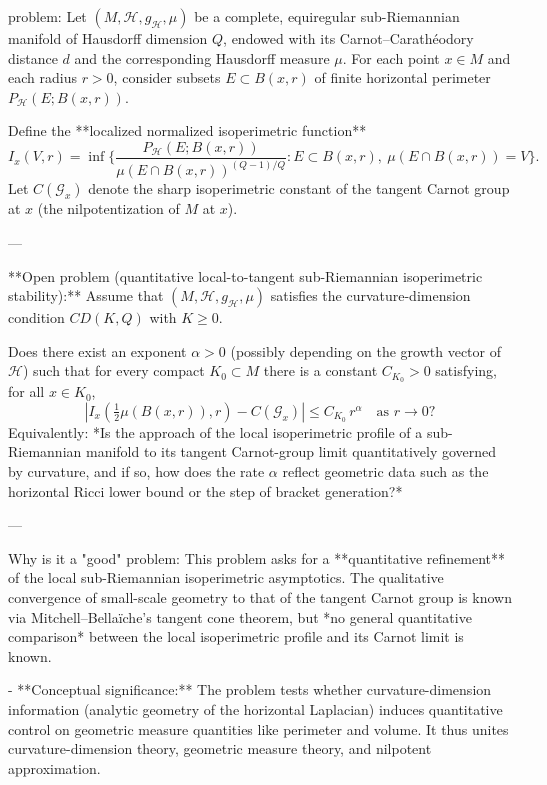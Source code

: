 problem:  
Let \((M, \mathcal{H}, g_{\mathcal{H}}, \mu)\) be a complete, equiregular sub-Riemannian manifold of Hausdorff dimension \(Q\), endowed with its Carnot–Carathéodory distance \(d\) and the corresponding Hausdorff measure \(\mu\). For each point \(x \in M\) and each radius \(r > 0\), consider subsets \(E \subset B(x,r)\) of finite horizontal perimeter \(P_{\mathcal{H}}(E; B(x,r))\).  

Define the **localized normalized isoperimetric function**  
\[
I_x(V, r) = \inf\Bigg\{ 
\frac{P_{\mathcal{H}}(E; B(x,r))}{\mu(E\cap B(x,r))^{(Q-1)/Q}} 
: E \subset B(x,r),\ \mu(E\cap B(x,r)) = V
\Bigg\}.
\]
Let \(C(\mathcal{G}_x)\) denote the sharp isoperimetric constant of the tangent Carnot group at \(x\) (the nilpotentization of \(M\) at \(x\)).  

---

**Open problem (quantitative local-to-tangent sub-Riemannian isoperimetric stability):**  
Assume that \((M, \mathcal{H}, g_{\mathcal{H}}, \mu)\) satisfies the curvature-dimension condition \(CD(K,Q)\) with \(K \ge 0\).  

Does there exist an exponent \(\alpha > 0\) (possibly depending on the growth vector of \(\mathcal{H}\)) such that for every compact \(K_0 \subset M\) there is a constant \(C_{K_0} > 0\) satisfying, for all \(x \in K_0\),
\[
\left| I_x\!\left(\tfrac{1}{2}\mu(B(x,r)), r\right) - C(\mathcal{G}_x) \right|
\le C_{K_0}\, r^{\alpha} \quad \text{as } r \to 0?
\]
Equivalently: *Is the approach of the local isoperimetric profile of a sub-Riemannian manifold to its tangent Carnot-group limit quantitatively governed by curvature, and if so, how does the rate \(\alpha\) reflect geometric data such as the horizontal Ricci lower bound or the step of bracket generation?*

---

Why is it a "good" problem:  
This problem asks for a **quantitative refinement** of the local sub-Riemannian isoperimetric asymptotics. The qualitative convergence of small-scale geometry to that of the tangent Carnot group is known via Mitchell–Bellaïche’s tangent cone theorem, but *no general quantitative comparison* between the local isoperimetric profile and its Carnot limit is known.  

- **Conceptual significance:** The problem tests whether curvature-dimension information (analytic geometry of the horizontal Laplacian) induces quantitative control on geometric measure quantities like perimeter and volume. It thus unites curvature-dimension theory, geometric measure theory, and nilpotent approximation.  

